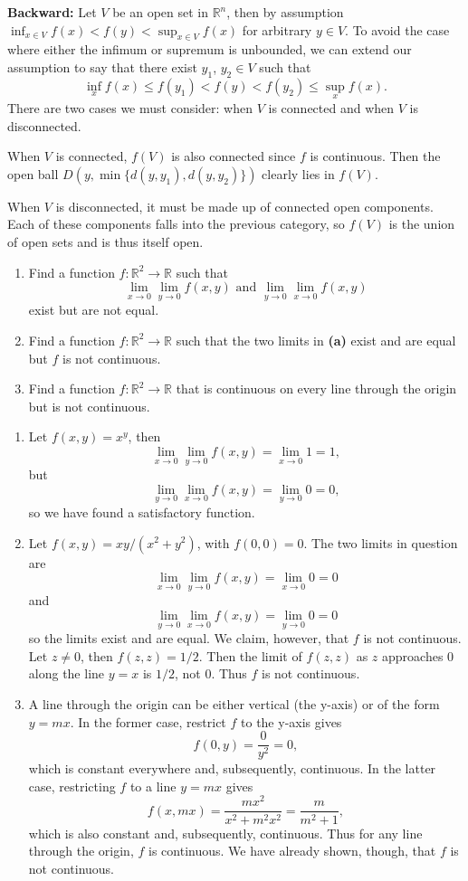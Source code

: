 \documentclass[10pt]{amsart}
\newenvironment{exercise}[1]{%
        \vspace{10mm}
        \renewcommand\themanualtheoreminner{#1}%
  \manualtheoreminner
}\hrulefill{\endmanualtheoreminner}
\begin{document}
\textbf{Backward:} Let $V$ be an open set in $\mathbb{R}^n$, then by assumption $\inf_{x\in V}f(x) < f(y) < \sup_{x\in V}f(x)$ for arbitrary $y \in V$. To avoid the case where either the infimum or supremum is unbounded, we can extend our assumption to say that there exist $y_1$, $y_2 \in V$ such that \[\inf_x f(x) \leq f(y_1) < f(y) < f(y_2) \leq \sup_x f(x).\] There are two cases we must consider: when $V$ is connected and when $V$ is disconnected.

When $V$ is connected, $f(V)$ is also connected since $f$ is continuous. Then the open ball $D(y, \min\{d(y,y_1), d(y,y_2)\})$ clearly lies in $f(V)$.

When $V$ is disconnected, it must be made up of connected open components. Each of these components falls into the previous category, so $f(V)$ is the union of open sets and is thus itself open.

\begin{exercise}{14}
	\begin{enumerate}
		\item Find a function $f:\mathbb{R}^2\to\mathbb{R}$ such that
			\[
				\lim_{x \to 0} \lim_{y \to 0} f(x,y) \text{ and } \lim_{y \to 0} \lim_{x \to 0} f(x,y)
			\] exist but are not equal.
		\item Find a function $f:\mathbb{R}^2\to\mathbb{R}$ such that the two limits in \textbf{(a)} exist and are equal but $f$ is not continuous.
		\item Find a function $f:\mathbb{R}^2\to\mathbb{R}$ that is continuous on every line through the origin but is not continuous.
	\end{enumerate}
\end{exercise}

\begin{enumerate}
	\item Let $f(x,y) = x^y$, then \[
			\lim_{x \to 0} \lim_{y \to 0} f(x,y) = \lim_{x \to 0} 1 = 1,
	\] but
	\[
		\lim_{y \to 0} \lim_{x \to 0} f(x,y) = \lim_{y \to 0} 0 = 0,
	\] so we have found a satisfactory function.

\item Let $f(x,y) = xy/(x^2+y^2)$, with $f(0,0)=0$. The two limits in question are
	\[
		\lim_{x \to 0} \lim_{y \to 0} f(x,y) = \lim_{x \to 0} 0 = 0
	\] and
	\[
		\lim_{y \to 0} \lim_{x \to 0} f(x,y) = \lim_{y \to 0} 0 = 0
	\] so the limits exist and are equal. We claim, however, that $f$ is not continuous. Let $z \neq 0$, then $f(z,z) = 1/2$. Then the limit of $f(z,z)$ as $z$ approaches $0$ along the line $y=x$ is $1/2$, not $0$. Thus $f$ is not continuous.

\item A line through the origin can be either vertical (the y-axis) or of the form $y=mx$. In the former case, restrict $f$ to the y-axis gives
	\[
		f(0,y) = \frac{0}{y^2} = 0,
	\] which is constant everywhere and, subsequently, continuous. In the latter case, restricting $f$ to a line $y=mx$ gives
	\[
		f(x,mx) = \frac{mx^2}{x^2 + m^2x^2} = \frac{m}{m^2 + 1},
	\] which is also constant and, subsequently, continuous. Thus for any line through the origin, $f$ is continuous. We have already shown, though, that $f$ is not continuous.
\end{enumerate}
\end{document}
